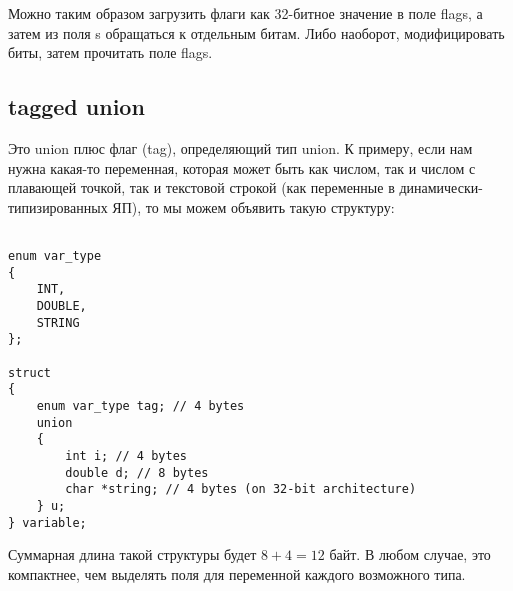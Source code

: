 Можно таким образом загрузить флаги как 32-битное значение в поле flags, а затем из поля s обращаться
к отдельным битам. Либо наоборот, модифицировать биты, затем прочитать поле flags.

\subsection{tagged union}

Это union плюс флаг (tag), определяющий тип union. К примеру, если нам нужна какая-то переменная,
которая может быть как числом, так и числом с плавающей точкой, так и текстовой строкой (как переменные
в динамически-типизированных ЯП), то мы можем объявить такую структуру:

\begin{lstlisting}

enum var_type
{
	INT,
	DOUBLE,
	STRING
};

struct
{
	enum var_type tag; // 4 bytes
	union
	{
		int i; // 4 bytes
		double d; // 8 bytes
		char *string; // 4 bytes (on 32-bit architecture)
	} u;
} variable;
\end{lstlisting}

Суммарная длина такой структуры будет $8+4=12$ байт. В любом случае, это компактнее, чем выделять
поля для переменной каждого возможного типа.


